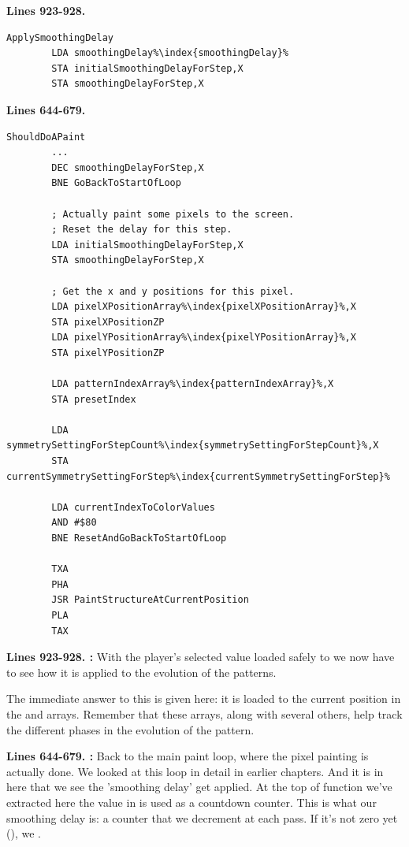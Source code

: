 \clearpage

\textbf{Lines 923-928. }
\begin{lstlisting}[caption=From \icode{MainInterruptHandler}.,escapechar=\%]
ApplySmoothingDelay    
        LDA smoothingDelay%\index{smoothingDelay}%
        STA initialSmoothingDelayForStep,X
        STA smoothingDelayForStep,X
\end{lstlisting}
\textbf{Lines 644-679. }
\begin{lstlisting}[caption=From \icode{MainPaintLoop\index{MainPaintLoop}}.,escapechar=\%]
ShouldDoAPaint   
        ...
        DEC smoothingDelayForStep,X
        BNE GoBackToStartOfLoop

        ; Actually paint some pixels to the screen.
        ; Reset the delay for this step.
        LDA initialSmoothingDelayForStep,X
        STA smoothingDelayForStep,X

        ; Get the x and y positions for this pixel.
        LDA pixelXPositionArray%\index{pixelXPositionArray}%,X
        STA pixelXPositionZP
        LDA pixelYPositionArray%\index{pixelYPositionArray}%,X
        STA pixelYPositionZP

        LDA patternIndexArray%\index{patternIndexArray}%,X
        STA presetIndex

        LDA symmetrySettingForStepCount%\index{symmetrySettingForStepCount}%,X
        STA currentSymmetrySettingForStep%\index{currentSymmetrySettingForStep}%

        LDA currentIndexToColorValues
        AND #$80
        BNE ResetAndGoBackToStartOfLoop

        TXA 
        PHA 
        JSR PaintStructureAtCurrentPosition
        PLA 
        TAX 
\end{lstlisting}
\clearpage

\textbf{Lines 923-928. :} With the player's selected value loaded 
safely to  we now have to see how it is applied to the evolution of the patterns.

The immediate answer to this is given here: it is loaded to the current position in the 
 and  arrays. Remember that these
arrays, along with several others, help track the different phases in the evolution of the pattern.


\textbf{Lines 644-679. :}  Back to the main paint loop, where the
pixel painting is actually done. We looked at this loop in detail in earlier chapters. And it is in
here that we see the 'smoothing delay' get applied. At the top of function we've extracted here
the value in  is used as a countdown counter. This is what our
smoothing delay is: a counter that we decrement at each pass. If it's not zero yet (),
we .

